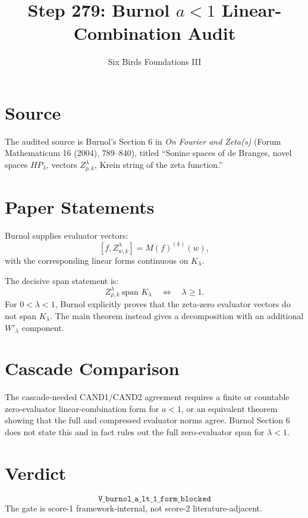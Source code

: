 \documentclass[11pt]{article}
\title{Step 279: Burnol \(a<1\) Linear-Combination Audit}
\author{Six Birds Foundations III}
\date{}
\begin{document}
\maketitle

\section*{Source}
The audited source is Burnol's Section 6 in \emph{On Fourier and Zeta(s)}
(Forum Mathematicum 16 (2004), 789--840), titled
``Sonine spaces of de Branges, novel spaces \(HP_\lambda\), vectors
\(Z^\lambda_{\rho,k}\), Krein string of the zeta function.''

\section*{Paper Statements}
Burnol supplies evaluator vectors:
\[
[f,Z^\lambda_{w,k}] = M(f)^{(k)}(w),
\]
with the corresponding linear forms continuous on \(K_\lambda\).

The decisive span statement is:
\[
Z^\lambda_{\rho,k}\ \text{span }K_\lambda
\quad\Longleftrightarrow\quad
\lambda\ge 1.
\]
For \(0<\lambda<1\), Burnol explicitly proves that the zeta-zero evaluator
vectors do not span \(K_\lambda\).  The main theorem instead gives a
decomposition with an additional \(W'_\lambda\) component.

\section*{Cascade Comparison}
The cascade-needed CAND1/CAND2 agreement requires a finite or countable
zero-evaluator linear-combination form for \(a<1\), or an equivalent theorem
showing that the full and compressed evaluator norms agree.  Burnol Section 6
does not state this and in fact rules out the full zero-evaluator span for
\(\lambda<1\).

\section*{Verdict}
\[
\boxed{\texttt{V\_burnol\_a\_lt\_1\_form\_blocked}}
\]
The gate is score-1 framework-internal, not score-2 literature-adjacent.
\end{document}
